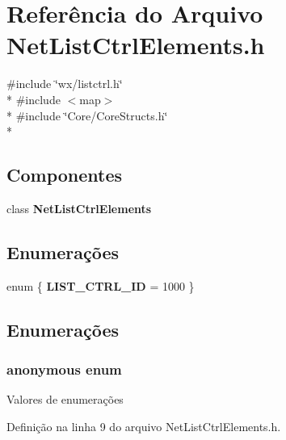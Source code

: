 \section{Referência do Arquivo Net\+List\+Ctrl\+Elements.\+h}
\label{_net_list_ctrl_elements_8h}
{\ttfamily \#include \char`\"{}wx/listctrl.\+h\char`\"{}}\\*
{\ttfamily \#include $<$map$>$}\\*
{\ttfamily \#include \char`\"{}Core/\+Core\+Structs.\+h\char`\"{}}\\*
\subsection*{Componentes}
\begin{DoxyCompactItemize}
\item 
class {\bf Net\+List\+Ctrl\+Elements}
\end{DoxyCompactItemize}
\subsection*{Enumerações}
\begin{DoxyCompactItemize}
\item 
enum \{ {\bf L\+I\+S\+T\+\_\+\+C\+T\+R\+L\+\_\+\+ID} = 1000
 \}
\end{DoxyCompactItemize}


\subsection{Enumerações}
\subsubsection[{anonymous enum}]{\setlength{\rightskip}{0pt plus 5cm}anonymous enum}\label{_net_list_ctrl_elements_8h_adb49720dc49f7d4e4cf9adbf2948e409}
\begin{Desc}
\item[Valores de enumerações]\par
\begin{description}
\item[{\em 
L\+I\+S\+T\+\_\+\+C\+T\+R\+L\+\_\+\+ID\label{_net_list_ctrl_elements_8h_adb49720dc49f7d4e4cf9adbf2948e409ae5c157653317cf81df9be730f2ad8315}
}]\end{description}
\end{Desc}


Definição na linha 9 do arquivo Net\+List\+Ctrl\+Elements.\+h.

